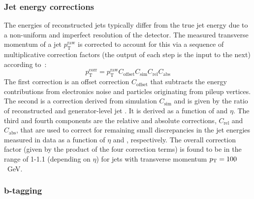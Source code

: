 \subsubsection{Jet energy corrections}
\label{sec:detector-jecs}
The energies of reconstructed jets typically differ from the true jet energy 
due to a non-uniform and imperfect resolution of the 
detector. The measured transverse momentum of a jet 
$p_{\mathrm{T}}^{\mathrm{raw}}$ is corrected to account for this via a sequence 
of multiplicative correction factors (the output of each step is the input to 
the next) according to~\cite{jec}:
\begin{equation}
p_{\mathrm{T}}^{\mathrm{corr}} =  p_{\mathrm{T}}^{\mathrm{raw}} 
C_{\mathrm{offset}} C_{\mathrm{sim}} C_{\mathrm{rel}} C_{\mathrm{abs}} 
\end{equation}
The first correction is an offset correction $C_{\mathrm{offset}}$ that 
subtracts the energy contributions from electronics noise and particles 
originating from pileup vertices. 
The second is a correction derived from simulation $C_{\mathrm{sim}}$ and is 
given by the ratio of reconstructed and generator-level jet \pt. It is derived 
as a function of \pt and $\eta$. 
The third and fourth components are the relative and absolute corrections, 
$C_{\mathrm{rel}}$ and $C_{\mathrm{abs}}$, that are used to correct for 
remaining small discrepancies in the jet energies measured in data as a 
function of $\eta$ and \pt, respectively. 
The overall correction factor (given by the product of the four correction 
terms) is found to be in the range of 1-1.1 (depending on $\eta$) for jets with 
transverse momentum ${p_{\text T}}=100$~GeV.

\subsubsection{b-tagging}
\label{sec:detector-btagging}

